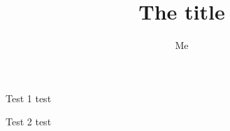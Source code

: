 \documentclass{beamer}
\author{Me}
\title{The title}
\institute{My institute}
\begin{document}
	\begin{frame}
	\titlepage
\end{frame}

\begin{frame}{Test 1}
test
\end{frame}

\begin{frame}{Test 2}
test
\end{frame}
\end{document}
